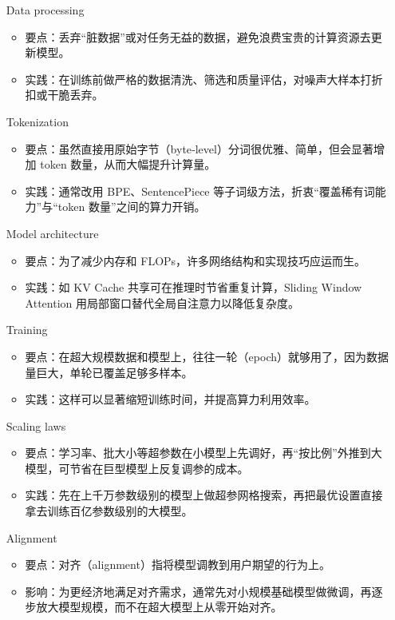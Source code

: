 \begin{itemize}[leftmargin=2cm]
  \item[Data processing]
  \begin{itemize}[leftmargin=0em,label={},noitemsep]
    \item 要点：丢弃“脏数据”或对任务无益的数据，避免浪费宝贵的计算资源去更新模型。
    \item 实践：在训练前做严格的数据清洗、筛选和质量评估，对噪声大样本打折扣或干脆丢弃。
  \end{itemize}

  \item[Tokenization]
  \begin{itemize}[leftmargin=0em,label={},noitemsep]
    \item 要点：虽然直接用原始字节（byte‐level）分词很优雅、简单，但会显著增加 token 数量，从而大幅提升计算量。
    \item 实践：通常改用 BPE、SentencePiece 等子词级方法，折衷“覆盖稀有词能力”与“token 数量”之间的算力开销。
  \end{itemize}

  \item[Model architecture]
  \begin{itemize}[leftmargin=0em,label={},noitemsep]
    \item 要点：为了减少内存和 FLOPs，许多网络结构和实现技巧应运而生。
    \item 实践：如 KV Cache 共享可在推理时节省重复计算，Sliding Window Attention 用局部窗口替代全局自注意力以降低复杂度。
  \end{itemize}

  \item[Training]
  \begin{itemize}[leftmargin=0em,label={},noitemsep]
    \item 要点：在超大规模数据和模型上，往往一轮（epoch）就够用了，因为数据量巨大，单轮已覆盖足够多样本。
    \item 实践：这样可以显著缩短训练时间，并提高算力利用效率。
  \end{itemize}

  \item[Scaling laws]
  \begin{itemize}[leftmargin=0em,label={},noitemsep]
    \item 要点：学习率、批大小等超参数在小模型上先调好，再“按比例”外推到大模型，可节省在巨型模型上反复调参的成本。
    \item 实践：先在上千万参数级别的模型上做超参网格搜索，再把最优设置直接拿去训练百亿参数级别的大模型。
  \end{itemize}

  \item[Alignment]
  \begin{itemize}[leftmargin=0em,label={},noitemsep]
    \item 要点：对齐（alignment）指将模型调教到用户期望的行为上。
    \item 影响：为更经济地满足对齐需求，通常先对小规模基础模型做微调，再逐步放大模型规模，而不在超大模型上从零开始对齐。
  \end{itemize}
\end{itemize}


